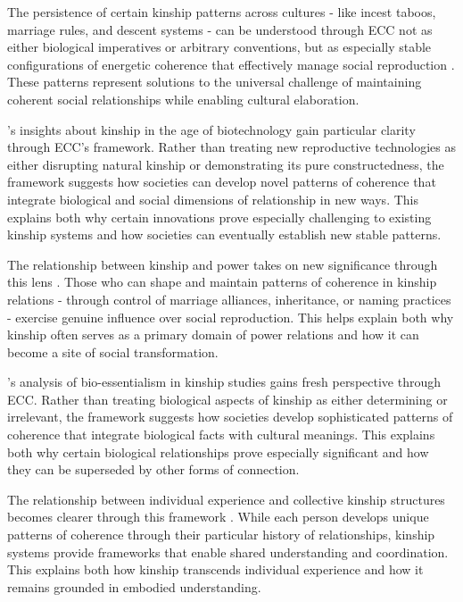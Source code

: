 The persistence of certain kinship patterns across cultures - like incest taboos, marriage rules, and descent systems - can be understood through ECC not as either biological imperatives or arbitrary conventions, but as especially stable configurations of energetic coherence that effectively manage social reproduction \cite{godelier2011metamorphoses}. These patterns represent solutions to the universal challenge of maintaining coherent social relationships while enabling cultural elaboration.

\cite{franklin2013biological}'s insights about kinship in the age of biotechnology gain particular clarity through ECC's framework. Rather than treating new reproductive technologies as either disrupting natural kinship or demonstrating its pure constructedness, the framework suggests how societies can develop novel patterns of coherence that integrate biological and social dimensions of relationship in new ways. This explains both why certain innovations prove especially challenging to existing kinship systems and how societies can eventually establish new stable patterns.

The relationship between kinship and power takes on new significance through this lens \cite{yanagisako1995naturalizing}. Those who can shape and maintain patterns of coherence in kinship relations - through control of marriage alliances, inheritance, or naming practices - exercise genuine influence over social reproduction. This helps explain both why kinship often serves as a primary domain of power relations and how it can become a site of social transformation.

\cite{wilson2016kinship}'s analysis of bio-essentialism in kinship studies gains fresh perspective through ECC. Rather than treating biological aspects of kinship as either determining or irrelevant, the framework suggests how societies develop sophisticated patterns of coherence that integrate biological facts with cultural meanings. This explains both why certain biological relationships prove especially significant and how they can be superseded by other forms of connection.

The relationship between individual experience and collective kinship structures becomes clearer through this framework \cite{mckinnon2005neoliberal}. While each person develops unique patterns of coherence through their particular history of relationships, kinship systems provide frameworks that enable shared understanding and coordination. This explains both how kinship transcends individual experience and how it remains grounded in embodied understanding.

